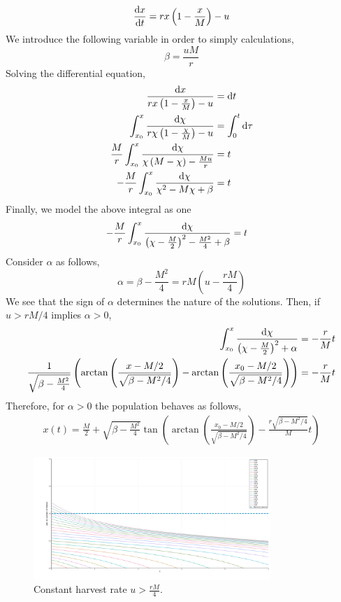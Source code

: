 \begin{equation}
\frac{\mathrm{d} x}{{\mathrm{d} t}}=rx\left(1-\frac{x}{M}\right)-u \label{eq: ConstantHarvest}
\end{equation}
We introduce the following variable in order to simply calculations,
\begin{equation}
\beta=\frac{uM}{r}
\end{equation}
Solving the differential equation,
\begin{align*}
	\frac{\mathrm{d} x}{rx\left(1-\frac{x}{M}\right)-u}&=\mathrm{d} t \\
	\int_{x_0}^{x}\frac{\mathrm{d} \chi}{r\chi\left(1-\frac{\chi}{M}\right)-u}&=\int_{0}^{t}\mathrm{d} \tau \\
	\frac{M}{r}\int_{x_0}^{x}\frac{\mathrm{d} \chi}{\chi\left(M-\chi\right)-\frac{Mu}{r}}&=t \\
	-\frac{M}{r}\int_{x_0}^{x}\frac{\mathrm{d} \chi}{\chi^2-M\chi+\beta}&=t \nonumber
	\end{align*}
Finally, we model the above integral as one 
\begin{align}
	-\frac{M}{r}\int_{x_0}^{x}\frac{\mathrm{d} \chi}{\left(\chi-\frac{M}{2}\right)^2-\frac{M^2}{4}+\beta}&=t
\end{align}
Consider $\alpha$ as follows,
\begin{equation}
	\alpha = \beta - \frac{M^2}{4} = rM\left(u-\frac{rM}{4}\right)
\end{equation}
We see that the sign of $\alpha$ determines the nature of the solutions. Then, if $u>rM/4$ implies $\alpha>0$,
\begin{align*}
\int_{x_0}^{x}\frac{\mathrm{d} \chi}{\left(\chi-\frac{M}{2}\right)^2+\alpha}&=-\frac{r}{M}t \\
\frac{1}{\sqrt{\beta-\frac{M^2}{4}}}\left(\arctan\left(\frac{x-M/2}{\sqrt{\beta-M^2/4}}\right)-\arctan\left(\frac{x_0-M/2}{\sqrt{\beta-M^2/4}}\right)\right)&=-\frac{r}{M}t \\
\end{align*}
Therefore, for $\alpha > 0$ the population behaves as follows, 
\begin{align}
	x(t)=\frac{M}{2}+\sqrt{\beta-\frac{M^2}{4}} \tan \left(\arctan\left(\frac{x_0-M/2}{\sqrt{\beta-M^2/4}}\right)-\frac{r\sqrt{\beta-M^2/4}}{M}t\right) \label{eq: ConstantHarvest OverExploit}
\end{align}

\begin{figure}[H]
	\centering
	\includegraphics[width=0.8\textwidth]{OverExploitConstant.png}
	\caption{Constant harvest rate $u>\frac{rM}{4}$.}
	\label{fig: OverExploitConstantHarvest}
\end{figure}

